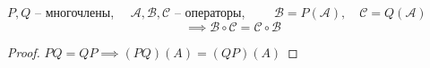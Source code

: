 \begin{implication}
	$ P, Q $ -- многочлены, $ \quad \mathcal{A}, \mathcal{B}, \mathcal{C} $ -- операторы, $ \qquad \mathcal{B} = P(\mathcal{A}), \quad \mathcal{C} = Q(\mathcal{A}) $
	$$ \implies \mathcal{B} \circ \mathcal{C} = \mathcal{C} \circ \mathcal{B} $$
\end{implication}

\begin{proof}
	$ PQ = QP \implies (PQ)(A) = (QP)(A) $
\end{proof}
